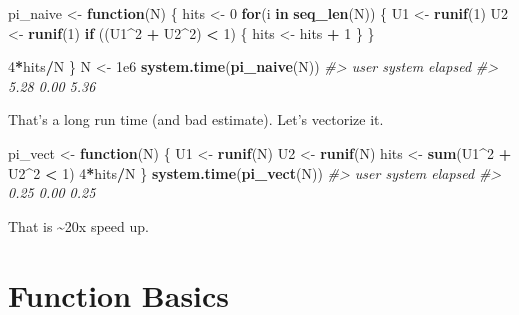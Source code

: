 \documentclass[]{book}
\newenvironment{Shaded}{\begin{snugshade}}{\end{snugshade}}
\newcommand{\KeywordTok}[1]{\textcolor[rgb]{0.13,0.29,0.53}{\textbf{#1}}}
\newcommand{\DecValTok}[1]{\textcolor[rgb]{0.00,0.00,0.81}{#1}}
\newcommand{\FloatTok}[1]{\textcolor[rgb]{0.00,0.00,0.81}{#1}}
\newcommand{\StringTok}[1]{\textcolor[rgb]{0.31,0.60,0.02}{#1}}
\newcommand{\CommentTok}[1]{\textcolor[rgb]{0.56,0.35,0.01}{\textit{#1}}}
\newcommand{\ControlFlowTok}[1]{\textcolor[rgb]{0.13,0.29,0.53}{\textbf{#1}}}
\newcommand{\OperatorTok}[1]{\textcolor[rgb]{0.81,0.36,0.00}{\textbf{#1}}}
\newcommand{\NormalTok}[1]{#1}
\theoremstyle{definition}
\theoremstyle{definition}
\theoremstyle{definition}
\theoremstyle{remark}
\begin{document}
\begin{Shaded}
\begin{Highlighting}[]
\NormalTok{pi_naive <-}\StringTok{ }\ControlFlowTok{function}\NormalTok{(N) \{}
\NormalTok{  hits <-}\StringTok{ }\DecValTok{0}
  \ControlFlowTok{for}\NormalTok{(i }\ControlFlowTok{in} \KeywordTok{seq_len}\NormalTok{(N)) \{}
\NormalTok{    U1 <-}\StringTok{ }\KeywordTok{runif}\NormalTok{(}\DecValTok{1}\NormalTok{)}
\NormalTok{    U2 <-}\StringTok{ }\KeywordTok{runif}\NormalTok{(}\DecValTok{1}\NormalTok{)}
    \ControlFlowTok{if}\NormalTok{ ((U1}\OperatorTok{^}\DecValTok{2} \OperatorTok{+}\StringTok{ }\NormalTok{U2}\OperatorTok{^}\DecValTok{2}\NormalTok{) }\OperatorTok{<}\StringTok{ }\DecValTok{1}\NormalTok{) \{}
\NormalTok{      hits <-}\StringTok{ }\NormalTok{hits }\OperatorTok{+}\StringTok{ }\DecValTok{1}
\NormalTok{    \}}
\NormalTok{  \}}
  
  \DecValTok{4}\OperatorTok{*}\NormalTok{hits}\OperatorTok{/}\NormalTok{N}
\NormalTok{\}}
\NormalTok{N <-}\StringTok{ }\FloatTok{1e6}
\KeywordTok{system.time}\NormalTok{(}\KeywordTok{pi_naive}\NormalTok{(N))}
\CommentTok{#>    user  system elapsed }
\CommentTok{#>    5.28    0.00    5.36}
\end{Highlighting}
\end{Shaded}

That's a long run time (and bad estimate). Let's vectorize it.

\begin{Shaded}
\begin{Highlighting}[]
\NormalTok{pi_vect <-}\StringTok{ }\ControlFlowTok{function}\NormalTok{(N) \{}
\NormalTok{  U1 <-}\StringTok{ }\KeywordTok{runif}\NormalTok{(N)}
\NormalTok{  U2 <-}\StringTok{ }\KeywordTok{runif}\NormalTok{(N)}
\NormalTok{  hits <-}\StringTok{ }\KeywordTok{sum}\NormalTok{(U1}\OperatorTok{^}\DecValTok{2} \OperatorTok{+}\StringTok{ }\NormalTok{U2}\OperatorTok{^}\DecValTok{2} \OperatorTok{<}\StringTok{ }\DecValTok{1}\NormalTok{)}
  \DecValTok{4}\OperatorTok{*}\NormalTok{hits}\OperatorTok{/}\NormalTok{N}
\NormalTok{\}}
\KeywordTok{system.time}\NormalTok{(}\KeywordTok{pi_vect}\NormalTok{(N))}
\CommentTok{#>    user  system elapsed }
\CommentTok{#>    0.25    0.00    0.25}
\end{Highlighting}
\end{Shaded}

That is \textasciitilde{}20x speed up.

\section{Function Basics}\label{function-basics}
\end{document}
